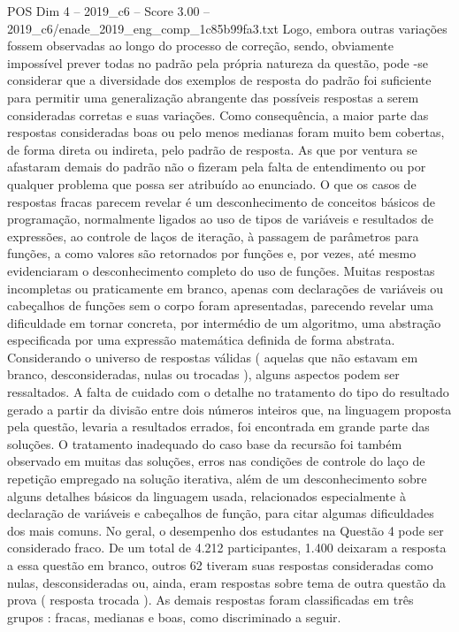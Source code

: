 \begin{textsample}{POS Dim 4 – 2019\_c6 – Score 3.00 – 2019\_c6/enade\_2019\_eng\_comp\_1c85b99fa3.txt}
Logo, embora outras variações fossem observadas ao longo do processo de correção, sendo, obviamente impossível prever todas no padrão pela própria natureza da questão, pode -se considerar que a diversidade dos exemplos de resposta do padrão foi suficiente para permitir uma generalização abrangente das possíveis respostas a serem consideradas corretas e suas variações.
Como consequência, a maior parte das respostas consideradas boas ou pelo menos medianas foram muito bem cobertas, de forma direta ou indireta, pelo padrão de resposta.
As que por ventura se afastaram demais do padrão não o fizeram pela falta de entendimento ou por qualquer problema que possa ser atribuído ao enunciado.
O que os casos de respostas fracas parecem revelar é um desconhecimento de conceitos básicos de programação, normalmente ligados ao uso de tipos de variáveis e resultados de expressões, ao controle de laços de iteração, à passagem de parâmetros para funções, a como valores são retornados por funções e, por vezes, até mesmo evidenciaram o desconhecimento completo do uso de funções.
Muitas respostas incompletas ou praticamente em branco, apenas com declarações de variáveis ou cabeçalhos de funções sem o corpo foram apresentadas, parecendo revelar uma dificuldade em tornar concreta, por intermédio de um algoritmo, uma abstração especificada por uma expressão matemática definida de forma abstrata.
Considerando o universo de respostas válidas ( aquelas que não estavam em branco, desconsideradas, nulas ou trocadas ), alguns aspectos podem ser ressaltados.
A falta de cuidado com o detalhe no tratamento do tipo do resultado gerado a partir da divisão entre dois números inteiros que, na linguagem proposta pela questão, levaria a resultados errados, foi encontrada em grande parte das soluções.
O tratamento inadequado do caso base da recursão foi também observado em muitas das soluções, erros nas condições de controle do laço de repetição empregado na solução iterativa, além de um desconhecimento sobre alguns detalhes básicos da linguagem usada, relacionados especialmente à declaração de variáveis e cabeçalhos de função, para citar algumas dificuldades dos mais comuns.
No geral, o desempenho dos estudantes na Questão 4 pode ser considerado fraco.
De um total de 4.212 participantes, 1.400 deixaram a resposta a essa questão em branco, outros 62 tiveram suas respostas consideradas como nulas, desconsideradas ou, ainda, eram respostas sobre tema de outra questão da prova ( resposta trocada ).
As demais respostas foram classificadas em três grupos : fracas, medianas e boas, como discriminado a seguir.

\end{textsample}
